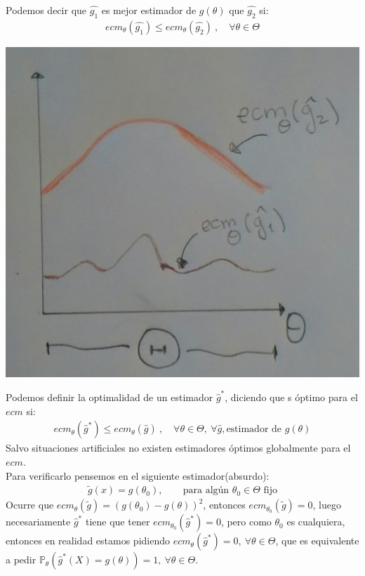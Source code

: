 \documentclass[10pt]{article}
\theoremstyle{plain}
\theoremstyle{definition}
\begin{document}
Podemos decir que $\hat{g_{1}}$ es mejor estimador de $g(\theta)$ que $\hat{g_{2}}$ si:
\begin{align*}
ecm_{\theta}(\hat{g_{1}}) \le ecm_{\theta}(\hat{g_{2}})\ ,\quad \forall \theta \in \Theta
\end{align*}
\begin{center}
\includegraphics[scale=0.1]{imagenes/ecm.jpg}
\end{center}
Podemos definir la optimalidad de un estimador $\hat{g}^*$, diciendo que s óptimo para el $ecm$ si:
\begin{align*}
ecm_{\theta}(\hat{g}^*) \le ecm_{\theta}(\hat{g})\ ,\quad \forall \theta \in \Theta,\ \forall \hat{g}, \text{estimador de $g(\theta)$}
\end{align*}
Salvo situaciones artificiales no existen estimadores óptimos globalmente para el $ecm$.\\

Para verificarlo pensemos en el siguiente estimador(absurdo):
\begin{align*}
\tilde{g}(x) = g(\theta_{0}),\ &\quad \text{para algún $\theta_{0} \in \Theta$ fijo}
\end{align*}
Ocurre que $ecm_{\theta}(\tilde{g}) = (g(\theta_{0})-g(\theta))^2$, entonces $ecm_{\theta_{0}}(\tilde{g}) = 0$, luego necesariamente $\hat{g}^*$ tiene que tener $ecm_{\theta_{0}}(\hat{g}^*) = 0$, pero como $\theta_{0}$ es cualquiera, entonces en realidad estamos pidiendo $ecm_{\theta}(\hat{g}^*) = 0,\ \forall \theta \in \Theta$, que es equivalente a pedir $\mathbb{P}_{\theta}(\hat{g}^*(X) = g(\theta)) = 1,\ \forall \theta \in \Theta$.\\
\end{document}
